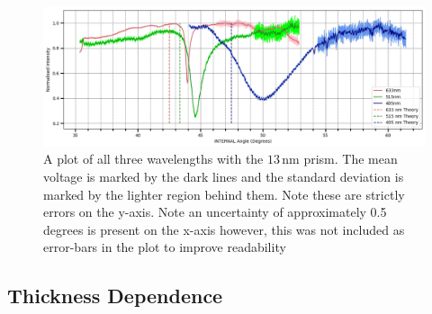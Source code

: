 \documentclass[%
reprint,
amsmath,amssymb,
aps,
]{revtex4-2}
\begin{document}
			\begin{table}[]
				\caption{A table of the dielectric constant of silver taken from M. Polyanskiy \cite{refractiveIndex}. Note that the imaginary part of $\epsilon_1$ is neglected as a first approximation.}
				\label{tab:dielectric}
			\end{table}
		
			\begin{figure}
				\includegraphics[width=1.85\columnwidth]{wavelengthDependence.png}
				\caption{\label{fig:wavelengthDependence}A plot of all three wavelengths with the $13\,\text{nm}$ prism. The mean voltage is marked by the dark lines and the standard deviation is marked by the lighter region behind them. Note these are strictly errors on the y-axis. Note an uncertainty of approximately 0.5 degrees is present on the x-axis however, this was not included as error-bars in the plot to improve readability}
			\end{figure}
		
		\subsection{Thickness Dependence}
			
\end{document}
